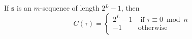 \begin{theorem}\label{thm:M_Sequence_Autocorrelation}
  If $\mathbf{s}$ is an $m$-sequence of length $2^{L}-1$, then
  \begin{equation}\label{eq:M_Sequence_Autocorrelation}
    C(\tau) =
    \begin{cases}
      2^{L} - 1 & \text{ if } \tau \equiv 0 \bmod n \\
      -1 & \text{otherwise} \\
    \end{cases}
  \end{equation}
\end{theorem}
